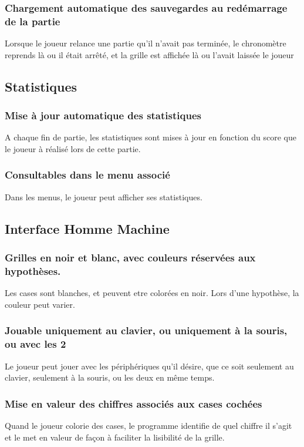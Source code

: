 \documentclass{report}
\begin{document}
		\subsubsection{Chargement automatique des sauvegardes au redémarrage de la partie}
			Lorsque le joueur relance une partie qu'il n'avait pas terminée, le chronomètre reprends là ou il était arrêté, et la grille est affichée là ou l'avait laissée le joueur
			
	\subsection{Statistiques}
		\subsubsection{Mise à jour automatique des statistiques}
			A chaque fin de partie, les statistiques sont mises à jour en fonction du score que le joueur à réalisé lors de cette partie.	
		\subsubsection{Consultables dans le menu associé}
			Dans les menus, le joueur peut afficher ses statistiques.
			
	\subsection{Interface Homme Machine}
		\subsubsection{Grilles en noir et blanc, avec couleurs réservées aux hypothèses.}
			Les cases sont blanches, et peuvent etre colorées en noir. Lors d'une hypothèse, la couleur peut varier.
		\subsubsection{Jouable uniquement au clavier, ou uniquement à la souris, ou avec les 2}
			Le joueur peut jouer avec les périphériques qu'il désire, que ce soit seulement au clavier, seulement à la souris, ou les deux en même temps.
		\subsubsection{Mise en valeur des chiffres associés aux cases cochées}
			Quand le joueur colorie des cases, le programme identifie de quel chiffre il s'agit et le met en valeur de façon à faciliter la lisibilité de la grille.
\end{document}
